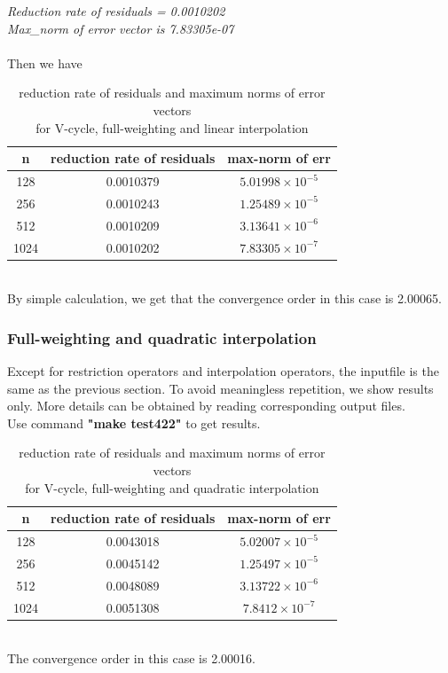 \documentclass[a4paper,twocolumn]{article}
\theoremstyle{definition}
\begin{document}
\noindent \emph{Reduction rate of residuals = 0.0010202}\\
\emph{Max\_norm of error vector is 7.83305e-07}\\\\
Then we have
\begin{table}[!htp]
	\centering
	\begin{tabular}{|c|c|c|}
		\hline	
		n & reduction rate of residuals &max-norm of err  \\
		\hline		
		128 &0.0010379& $5.01998\times 10^{-5}$ \\
		\hline		
		256 &0.0010243& $1.25489\times 10^{-5}$ \\
		\hline		
		512 &0.0010209& $3.13641\times 10^{-6}$ \\
		\hline		
		1024 &0.0010202& $7.83305\times 10^{-7}$ \\
		\hline
	\end{tabular}
	\caption{reduction rate of residuals and maximum norms of error vectors \\for V-cycle, full-weighting and linear interpolation}
\end{table}\\
\newpage
\noindent By simple calculation, we get that the convergence order in this case is 2.00065.
\subsubsection{Full-weighting and quadratic interpolation}
Except for restriction operators and interpolation operators, the inputfile is the same as the previous section. To avoid meaningless repetition, we show results only. More details can be obtained by reading corresponding output files.\\
Use command \textbf{"make test422"} to get results. 
\begin{table}[!htp]
	\centering
	\begin{tabular}{|c|c|c|}
		\hline	
		n & reduction rate of residuals & max-norm of err  \\
		\hline		
		128 &0.0043018 & $5.02007\times 10^{-5}$ \\
		\hline		
		256 &0.0045142 & $1.25497\times 10^{-5}$ \\
		\hline		
		512 &0.0048089 & $3.13722\times 10^{-6}$ \\
		\hline		
		1024 &0.0051308 & $7.8412\times 10^{-7}$ \\
		\hline
	\end{tabular}
	\caption{reduction rate of residuals and maximum norms of error vectors \\for V-cycle, full-weighting and quadratic interpolation}
\end{table}\\
The convergence order in this case is 2.00016.
\end{document}
